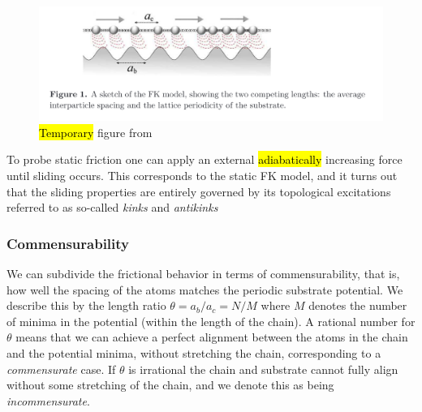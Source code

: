 \begin{figure}[H]
  \centering
  \includegraphics[width=0.8\linewidth]{figures/theory/FK_model.png}
  \caption{\hl{Temporary} figure from~\cite{Manini_2016}}
  \label{fig:FK_model}
\end{figure}

To probe static friction one can apply an external \hl{adiabatically} increasing force until sliding occurs. This corresponds to the static \acrshort{FK} model, and it turns out that the sliding properties are entirely governed by its topological excitations referred to as so-called \textit{kinks} and \textit{antikinks}

\subsubsection{Commensurability} We can subdivide the frictional behavior in terms of commensurability, that is, how well the spacing of the atoms matches the periodic substrate potential. We describe this by the length ratio $\theta = a_b / a_c = N / M$ where $M$ denotes the number of minima in the potential (within the length of the chain). A rational number for $\theta$ means that we can achieve a perfect alignment between the atoms in the chain and the potential minima, without stretching the chain, corresponding to a \textit{commensurate} case. If $\theta$ is irrational the chain and substrate cannot fully align without some stretching of the chain, and we denote this as being \textit{incommensurate}.

